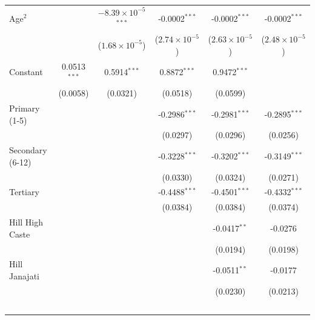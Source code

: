 \begin{tabular}{lccccc}
   Age$^2$                           &                 & $-8.39\times 10^{-5}$$^{***}$  & -0.0002$^{***}$         & -0.0002$^{***}$         & -0.0002$^{***}$\\   
                                     &                 & ($1.68\times 10^{-5}$)         & ($2.74\times 10^{-5}$)  & ($2.63\times 10^{-5}$)  & ($2.48\times 10^{-5}$)\\    
   Constant                          & 0.0513$^{***}$  & 0.5914$^{***}$                 & 0.8872$^{***}$          & 0.9472$^{***}$          &   \\   
                                     & (0.0058)        & (0.0321)                       & (0.0518)                & (0.0599)                &   \\   
   Primary (1-5)                     &                 &                                & -0.2986$^{***}$         & -0.2981$^{***}$         & -0.2895$^{***}$\\   
                                     &                 &                                & (0.0297)                & (0.0296)                & (0.0256)\\   
   Secondary (6-12)                  &                 &                                & -0.3228$^{***}$         & -0.3202$^{***}$         & -0.3149$^{***}$\\   
                                     &                 &                                & (0.0330)                & (0.0324)                & (0.0271)\\   
   Tertiary                          &                 &                                & -0.4488$^{***}$         & -0.4501$^{***}$         & -0.4332$^{***}$\\   
                                     &                 &                                & (0.0384)                & (0.0384)                & (0.0374)\\   
   Hill High Caste                   &                 &                                &                         & -0.0417$^{**}$          & -0.0276\\   
                                     &                 &                                &                         & (0.0194)                & (0.0198)\\   
   Hill Janajati                     &                 &                                &                         & -0.0511$^{**}$          & -0.0177\\   
                                     &                 &                                &                         & (0.0230)                & (0.0213)\\   
$$
\end{tabular}
